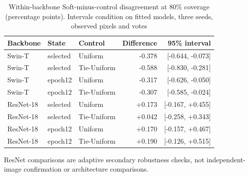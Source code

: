 \begin{table}[htbp]
\caption{Within-backbone Soft-minus-control disagreement at 80\% coverage (percentage points). Intervals condition on fitted models, three seeds, observed pixels and votes}\label{tab:backbones}
\centering\begin{tabular}{lllrr}\toprule
Backbone & State & Control & Difference & 95\% interval\\\midrule
Swin-T & selected & Uniform & -0.378 & [-0.644, -0.073]\\
Swin-T & selected & Tie-Uniform & -0.588 & [-0.830, -0.281]\\
Swin-T & epoch12 & Uniform & -0.317 & [-0.626, -0.050]\\
Swin-T & epoch12 & Tie-Uniform & -0.307 & [-0.585, -0.024]\\
ResNet-18 & selected & Uniform & +0.173 & [-0.167, +0.455]\\
ResNet-18 & selected & Tie-Uniform & +0.042 & [-0.258, +0.343]\\
ResNet-18 & epoch12 & Uniform & +0.170 & [-0.157, +0.467]\\
ResNet-18 & epoch12 & Tie-Uniform & +0.190 & [-0.126, +0.515]\\
\bottomrule\end{tabular}\par
\smallskip
ResNet comparisons are adaptive secondary robustness checks, not independent-image confirmation or architecture comparisons.\par
\end{table}

